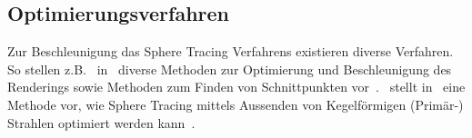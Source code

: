 \subsection{Optimierungsverfahren}
\label{subsec:further_work:optimisation}

Zur Beschleunigung das Sphere Tracing Verfahrens existieren diverse
Verfahren. So stellen z.B.~\citeauthor{keinert_enhanced_2014}
in~ diverse Methoden zur
Optimierung und Beschleunigung des Renderings sowie Methoden zum Finden
von Schnittpunkten vor~\parencite{keinert_enhanced_2014}.~\citeauthor{seven_rendering_2012} stellt
in~ eine Methode vor, wie Sphere Tracing
mittels Aussenden von Kegelförmigen (Primär-) Strahlen optimiert werden
kann~\parencite{seven_rendering_2012}.
